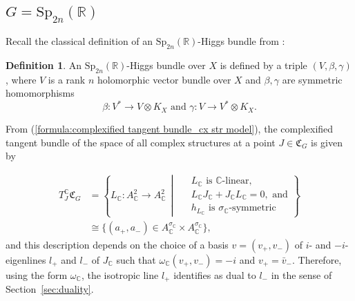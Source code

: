 \documentclass[oneside,11pt]{amsart}
\theoremstyle{definition}
\newtheorem{defn}[thm]{Definition}
\theoremstyle{remark}
\newcommand{\midwd}{\,\middle\vert\,}
\numberwithin{thm}{section}
\numberwithin{equation}{section}
\begin{document}
\subsection{\texorpdfstring{$G=\mathrm{Sp}_{2n}(\mathbb{R})$}{G=Sp(2n,R)}}\label{sec:comparison of defs}

Recall the classical definition of an $\mathrm{Sp}_{2n}( \mathbb{R})$-Higgs bundle from \cite[Section 3.1]{GGM}:

\begin{defn}\label{defn:classical_Sp2nR.ap}
An $\mathrm{Sp}_{2n}( \mathbb{R})$-Higgs bundle over $X$ is defined by a triple $\left( V,\beta ,\gamma  \right)$, where $V$ is a rank $n$ holomorphic vector bundle over $X$ and $\beta , \gamma$ are symmetric homomorphisms
	\[\beta :{{V}^{*}}\to V\otimes K_X\text{  and  }\gamma :V\to {{V}^{*}}\otimes K_X.\]
\end{defn}
From (\ref{formula:complexified tangent bundle_cx str model}), the complexified tangent bundle of the space of all complex structures at a point  $J\in\mathfrak{C}_G$ is given by 


\begin{align*}
 T^{\mathbb C}_J\mathfrak{C}_G& =\left\{L_\mathbb C\colon A_\mathbb C^2\to A_\mathbb C^2 \midwd
 \begin{aligned}
     &\ L_\mathbb C\text{ is $\mathbb C$-linear},\\
     &\ L_\mathbb CJ_\mathbb C+J_\mathbb CL_\mathbb C=0, \text{ and}\\
     &\ h_{L_\mathbb C}\text{ is $\sigma_\mathbb C$-symmetric}
 \end{aligned}
 \right\} \\
  & \cong \{(a_+,a_-)\in A_\mathbb C^{\sigma_\mathbb C}\times A_\mathbb C^{\sigma_\mathbb C}\}, 
 \end{align*}
and this description depends on the choice of a basis $v=(v_+,v_-)$ of $i$- and $-i$-eigenlines $l_+$ and $l_-$ of $J_\mathbb C$ such that $\omega_\mathbb C(v_+,v_-)=-i$ and $v_+=\bar v_-$. Therefore, using the form $\omega_{\mathbb{C}}$, the isotropic line $l_{+}$ identifies as dual to $l_{-}$ in the sense of Section~\ref{sec:duality}.
\end{document}
